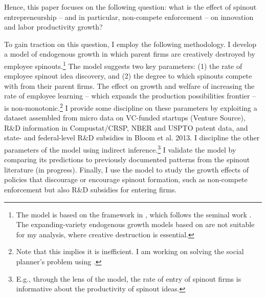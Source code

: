 \documentclass[12pt,english]{article}
\theoremstyle{remark}
\begin{document}
Hence, this paper focuses on the following question: what is the effect of spinout entrepreneurship -- and in particular, non-compete enforcement -- on innovation and labor productivity growth? 

To gain traction on this question, I employ the following methodology. I develop a model of endogenous growth in which parent firms are creatively destroyed by employee spinouts.\footnote{The model is based on the framework in \cite{akcigit_growth_2018}, which follows the seminal work \cite{grossman_quality_1991}. The expanding-variety endogenous growth models based on \cite{romer_increasing_1986} are not suitable for my analysis, where creative destruction is essential.} The model suggests two key parameters: (1) the rate of employee spinout idea discovery, and (2) the degree to which spinouts compete with from their parent firms. The effect on growth and welfare of increasing the rate of employee learning -- which expands the production possibilities frontier -- is non-monotonic.\footnote{Note that this implies it is inefficient. I am working on solving the social planner's problem using \cite{nuno_social_2018}.} I provide some discipline on these parameters by exploiting a dataset assembled from micro data on VC-funded startups (Venture Source), R\&D information in Compustat/CRSP, NBER and USPTO patent data, and state- and federal-level R\&D subsidies in Bloom et al. 2013. I discipline the other parameters of the model using indirect inference.\footnote{E.g., through the lens of the model, the rate of entry of spinout firms is informative about the productivity of spinout ideas.} I validate the model by comparing its predictions to previously documented patterns from the spinout literature (in progress). Finally, I use the model to study the growth effects of policies that discourage or encourage spinout formation, such as non-compete enforcement but also R\&D subsidies for entering firms. 
\end{document}

